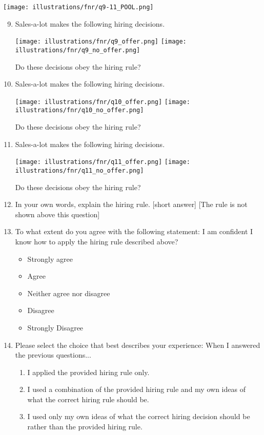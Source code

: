 \documentclass{article}
\newcommand{\correct}[1]{{\color{red}{#1}}}
\newcommand{\correct}[1]{{\color{red}{#1}}}
\begin{document}
\texttt{[image: illustrations/fnr/q9-11\_POOL.png]}
\begin{enumerate}
\setcounter{enumi}{8}
    \item Sales-a-lot makes the following hiring decisions.

    \texttt{[image: illustrations/fnr/q9\_offer.png]}
    \space\space\space
    \texttt{[image: illustrations/fnr/q9\_no\_offer.png]}
    
    Do these decisions obey the hiring rule? \correct{Yes}

\item Sales-a-lot makes the following hiring decisions.

    \texttt{[image: illustrations/fnr/q10\_offer.png]}
    \space\space\space
    \texttt{[image: illustrations/fnr/q10\_no\_offer.png]}
    
    Do these decisions obey the hiring rule? \correct{No}
    
\item Sales-a-lot makes the following hiring decisions.

    \texttt{[image: illustrations/fnr/q11\_offer.png]}
    \space\space\space
    \texttt{[image: illustrations/fnr/q11\_no\_offer.png]}
    
    Do these decisions obey the hiring rule? \correct{No}

\item In your own words, explain the hiring rule. [short answer] [The rule is not shown above this question]

\item To what extent do you agree with the following statement: I am confident I know how to apply the hiring rule described above?
\begin{itemize}
    \item Strongly agree
    \item Agree
    \item Neither agree nor disagree
    \item Disagree
    \item Strongly Disagree
\end{itemize}

\item Please select the choice that best describes your experience: When I answered the previous questions...
\begin{enumerate}
    \item I applied the provided hiring rule only.
    \item I used a combination of the provided hiring rule and my own ideas of what the correct hiring rule should be.
    \item I used only my own ideas of what the correct hiring decision should be rather than the provided hiring rule.
\end{enumerate}


\end{enumerate}
\end{document}
